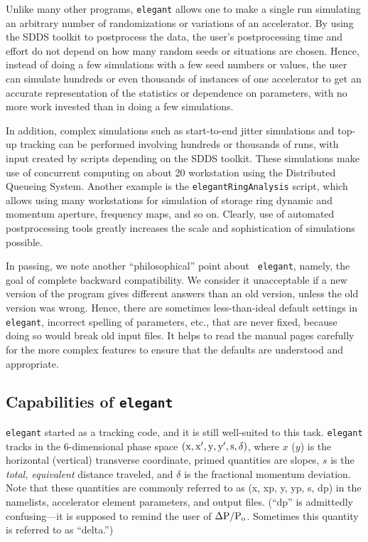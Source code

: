 \documentclass[11pt]{article}
\begin{document}
Unlike many other programs, {\tt elegant} allows one to make a single
run simulating an arbitrary number of randomizations or variations of
an accelerator.  By using the SDDS toolkit to postprocess the data,
the user's postprocessing time and effort do not depend on how many
random seeds or situations are chosen.  Hence, instead of doing a few
simulations with a few seed numbers or values, the user can simulate
hundreds or even thousands of instances of one accelerator to get an
accurate representation of the statistics or dependence on parameters,
with no more work invested than in doing a few simulations.

In addition, complex simulations such as start-to-end jitter
simulations\cite{S2EJitter} and top-up tracking\cite{TopUpTracking}
can be performed involving hundreds or thousands of runs, with input
created by scripts depending on the SDDS toolkit.  These simulations
make use of concurrent computing on about 20 workstation using the
Distributed Queueing System\cite{DQS}.  Another example is the {\tt elegantRingAnalysis} 
script, which allows using many workstations for simulation of storage ring
dynamic and momentum aperture, frequency maps, and so on.
Clearly, use of automated
postprocessing tools greatly increases the scale and sophistication of
simulations possible.  

In passing, we note another ``philosophical'' point about {\tt
elegant}, namely, the goal of complete backward compatibility.  We
consider it unacceptable if a new version of the program gives
different answers than an old version, unless the old version was
wrong.  Hence, there are sometimes less-than-ideal default settings in
{\tt elegant}, incorrect spelling of parameters, etc., that are never
fixed, because doing so would break old input files.  It helps to read
the manual pages carefully for the more complex features to ensure that
the defaults are understood and appropriate.

\subsection{Capabilities of {\tt elegant}}

{\tt elegant} started as a tracking code, and it is still well-suited
to this task.  {\tt elegant} tracks in the 6-dimensional phase space
${\rm (x, x^\prime, y, y^\prime, s, \delta)}$, where $x$ ($y$) is the
horizontal (vertical) transverse coordinate, primed quantities are
slopes, $s$ is the {\em total, equivalent} distance traveled, and $\delta$ is the
fractional momentum deviation\cite{KLBrown}.  Note that these
quantities are commonly referred to as (x, xp, y, yp, s, dp) in the
namelists, accelerator element parameters, and output files.  (``dp''
is admittedly confusing---it is supposed to remind the user of ${\rm
\Delta P/P_o}$.  Sometimes this quantity is referred to as ``delta.'')
\end{document}

